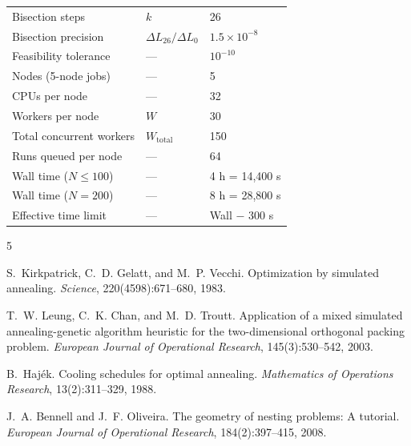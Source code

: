 \documentclass[11pt,oneside]{article}
\begin{document}
\begin{center}
\begin{tabular}{lll}
Bisection steps            & $k$                 & 26 \\
Bisection precision        & $\Delta L_{26}/\Delta L_0$  & $1.5\times10^{-8}$ \\
Feasibility tolerance      & ---                 & $10^{-10}$ \\
\midrule
Nodes (5-node jobs)        & ---                 & 5 \\
CPUs per node              & ---                 & 32 \\
Workers per node           & $W$                 & 30 \\
Total concurrent workers   & $W_{\mathrm{total}}$& 150 \\
Runs queued per node       & ---                 & 64 \\
Wall time ($N \leq 100$)   & ---                 & 4 h = 14{,}400 s \\
Wall time ($N = 200$)      & ---                 & 8 h = 28{,}800 s \\
Effective time limit       & ---                 & Wall $-$ 300 s \\
\bottomrule
\end{tabular}
\end{center}


\begin{thebibliography}{5}

S.~Kirkpatrick, C.~D. Gelatt, and M.~P. Vecchi.
Optimization by simulated annealing.
\textit{Science}, 220(4598):671--680, 1983.

T.~W. Leung, C.~K. Chan, and M.~D. Troutt.
Application of a mixed simulated annealing-genetic algorithm heuristic
for the two-dimensional orthogonal packing problem.
\textit{European Journal of Operational Research}, 145(3):530--542, 2003.

B.~Haj\'ek.
Cooling schedules for optimal annealing.
\textit{Mathematics of Operations Research}, 13(2):311--329, 1988.

J.~A. Bennell and J.~F. Oliveira.
The geometry of nesting problems: A tutorial.
\textit{European Journal of Operational Research}, 184(2):397--415, 2008.

\end{thebibliography}
\end{document}
